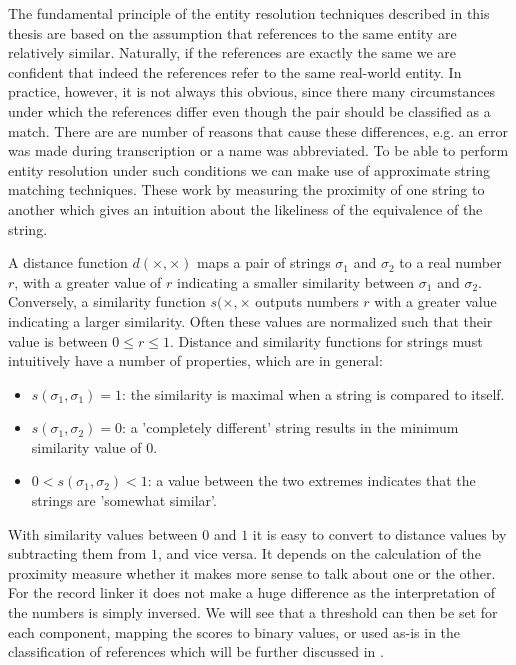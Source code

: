 The fundamental principle of the entity resolution techniques described in this thesis are based on the assumption that references to the same entity are relatively similar.
Naturally, if the references are exactly the same we are confident that indeed the references refer to the same real-world entity.
In practice, however, it is not always this obvious, since there many circumstances under which the references differ even though the pair should be classified as a match.
There are are number of reasons that cause these differences, e.g. an error was made during transcription or a name was abbreviated.
To be able to perform entity resolution under such conditions we can make use of approximate string matching techniques.
These work by measuring the proximity of one string to another which gives an intuition about the likeliness of the equivalence of the string.

A distance function $d(\times, \times)$ maps a pair of strings $\sigma_1$ and $\sigma_2$ to a real number $r$, with a greater value of $r$ indicating a smaller similarity between $\sigma_1$ and $\sigma_2$.\cite{cohen03}
Conversely, a similarity function $s(\times, \times$ outputs numbers $r$ with a greater value indicating a larger similarity.
Often these values are normalized such that their value is between $0 \leq r \leq 1$.
Distance and similarity functions for strings must intuitively have a number of properties, which are in general:\cite{christen12}

\begin{itemize}
    \item $s(\sigma_1, \sigma_1)=1$: the similarity is maximal when a string is compared to itself.
    \item $s(\sigma_1, \sigma_2)=0$: a 'completely different' string results in the minimum similarity value of $0$.
    \item $0 < s(\sigma_1, \sigma_2) < 1$: a value between the two extremes indicates that the strings are 'somewhat similar'.
\end{itemize}

With similarity values between $0$ and $1$ it is easy to convert to distance values by subtracting them from $1$, and vice versa.
It depends on the calculation of the proximity measure whether it makes more sense to talk about one or the other.
For the record linker it does not make a huge difference as the interpretation of the numbers is simply inversed.
We will see that a threshold can then be set for each component, mapping the scores to binary values, or used as-is in the classification of references which will be further discussed in .

